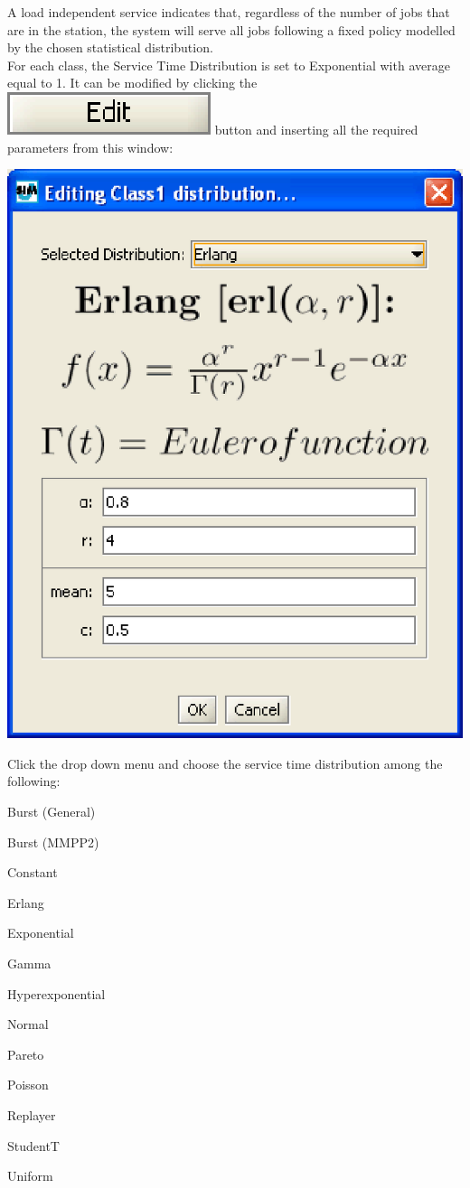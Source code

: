 A load independent service indicates that, regardless of the number of jobs that are in the station, the system will serve all jobs following a fixed policy modelled by the chosen statistical distribution.\\
For each class, the Service Time Distribution is set to Exponential with average equal to 1. It can be modified by clicking the  \includegraphics[scale=.5]{img/jsim/edit.eps} button and inserting all the required parameters from this window:
\begin{center}
\includegraphics[scale=.5]{img/jsim/erlang.eps}
\end{center}
Click the drop down menu and choose the service time distribution among the following:
\begin{itemize*}
\item Burst (General) \item Burst (MMPP2) \item Constant \item
Erlang \item Exponential \item Gamma \item Hyperexponential \item
Normal \item Pareto \item Poisson \item Replayer \item StudentT
\item Uniform
\end{itemize*}
